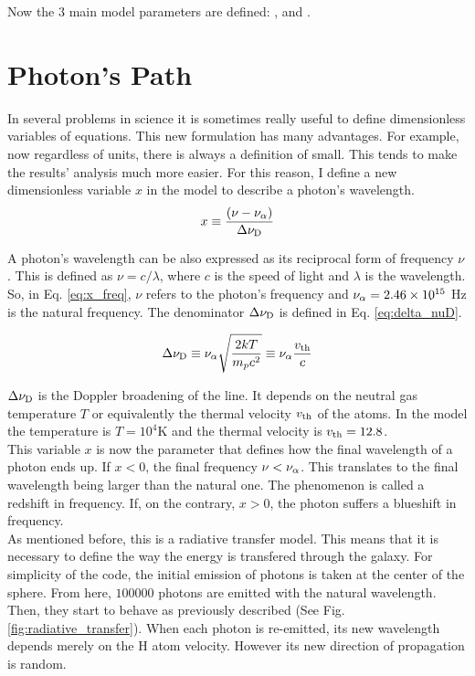 Now the 3 main model parameters are defined: \vrot, \vout and \tauh. \\


\section{Photon's Path}
In several problems in science it is sometimes really useful to define dimensionless variables of equations. This new formulation has many advantages. For example, now regardless of units, there is always a definition of small. This tends to make the results' analysis much more easier. For this reason, I define a new dimensionless variable $x$ in the model to describe a photon's wavelength.\\

\begin{equation}
\label{eq:x_freq}
x \equiv \frac{(\nu -\nu_{\rm \alpha})}{\Delta\nu_{\rm D}}
\end{equation} 

A photon's wavelength can be also expressed as its reciprocal form of frequency $\nu$. This is defined as $\nu = c/\lambda$, where $c$ is the speed of light and $\lambda$ is the wavelength. So, in Eq. \ref{eq:x_freq}, $\nu$ refers to the photon's frequency and $\nu_{\rm \alpha} = 2.46\times 10^{15}$ Hz is the \lya natural frequency. The denominator $\Delta\nu_{\rm D}$ is defined in Eq. \ref{eq:delta_nuD}.

\begin{equation}
\label{eq:delta_nuD}
\Delta\nu_{\rm D} \equiv \nu_{\rm \alpha}\sqrt{\frac{2kT}{m_pc^2}} \equiv \nu_{\rm \alpha} \frac{v_{\rm th}}{c}
\end{equation} 

$\Delta\nu_{\rm D}$ is the Doppler broadening of the \lya line. It depends on the neutral gas temperature $T$ or equivalently the thermal velocity $v_{\rm th}$ of the atoms. In the model the temperature is $T=10^4$K and the thermal velocity is $v_{\rm th}=12.8$\kms. \\

This variable $x$ is now the parameter that defines how the final wavelength of a photon ends up. If $x < 0$, the final frequency $\nu < \nu_{\rm \alpha}$. This translates to the final wavelength being larger than the \lya natural one. The phenomenon is called a redshift in frequency. If, on the contrary, $x > 0$, the photon suffers a blueshift in frequency. \\

As mentioned before, this is a radiative transfer model. This means that it is necessary to define the way the energy is transfered through the galaxy. For simplicity of the code, the initial emission of photons is taken at the center of the sphere. From here, $100000$ photons are emitted with the natural \lya wavelength. Then, they start to behave as previously described (See Fig. \ref{fig:radiative_transfer}). When each photon is re-emitted, its new wavelength depends merely on the H atom velocity. However its new direction of propagation is random. \\ 

